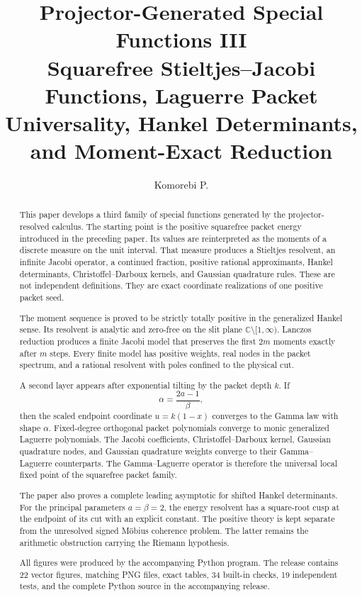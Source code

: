 \documentclass[11pt,openany]{report}
\title{\textbf{Projector-Generated Special Functions III}\\[0.25em]
\Large Squarefree Stieltjes--Jacobi Functions, Laguerre Packet Universality, Hankel Determinants, and Moment-Exact Reduction}
\author{Komorebi P.}
\date{}
\theoremstyle{definition}
\theoremstyle{remark}
\newcommand{\C}{\mathbb C}
\begin{document}
\maketitle

\begin{abstract}
This paper develops a third family of special functions generated by the projector-resolved calculus. The starting point is the positive squarefree packet energy introduced in the preceding paper. Its values are reinterpreted as the moments of a discrete measure on the unit interval. That measure produces a Stieltjes resolvent, an infinite Jacobi operator, a continued fraction, positive rational approximants, Hankel determinants, Christoffel--Darboux kernels, and Gaussian quadrature rules. These are not independent definitions. They are exact coordinate realizations of one positive packet seed.

The moment sequence is proved to be strictly totally positive in the generalized Hankel sense. Its resolvent is analytic and zero-free on the slit plane $\C\setminus[1,\infty)$. Lanczos reduction produces a finite Jacobi model that preserves the first $2m$ moments exactly after $m$ steps. Every finite model has positive weights, real nodes in the packet spectrum, and a rational resolvent with poles confined to the physical cut.

A second layer appears after exponential tilting by the packet depth $k$. If
\[
\alpha=\frac{2a-1}{\beta},
\]
then the scaled endpoint coordinate $u=k(1-x)$ converges to the Gamma law with shape $\alpha$. Fixed-degree orthogonal packet polynomials converge to monic generalized Laguerre polynomials. The Jacobi coefficients, Christoffel--Darboux kernel, Gaussian quadrature nodes, and Gaussian quadrature weights converge to their Gamma--Laguerre counterparts. The Gamma--Laguerre operator is therefore the universal local fixed point of the squarefree packet family.

The paper also proves a complete leading asymptotic for shifted Hankel determinants. For the principal parameters $a=\beta=2$, the energy resolvent has a square-root cusp at the endpoint of its cut with an explicit constant. The positive theory is kept separate from the unresolved signed M\"obius coherence problem. The latter remains the arithmetic obstruction carrying the Riemann hypothesis.

All figures were produced by the accompanying Python program. The release contains 22 vector figures, matching PNG files, exact tables, 34 built-in checks, 19 independent tests, and the complete Python source in the accompanying release.
\end{abstract}
\end{document}
